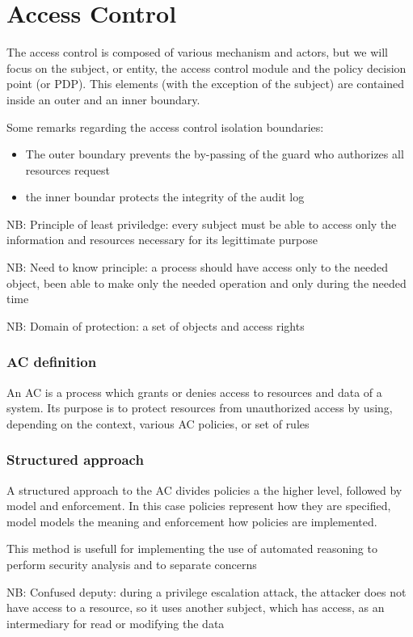 \documentclass[12pt, a4paper]{article}
\begin{document}
\newpage
\section{Access Control}
The access control is composed of various mechanism and actors, but we will focus on the subject, or entity, the 
access control module and the policy decision point (or PDP). This elements (with the exception of the subject)
are contained inside an outer and an inner boundary. 

Some remarks regarding the access control isolation boundaries: 
\begin{itemize}
    \item The outer boundary prevents the by-passing of the guard who authorizes all resources request
    \item the inner boundar protects the integrity of the audit log
\end{itemize}

NB: Principle of least priviledge: every subject must be able to access only the information and resources 
necessary for its legittimate purpose

NB: Need to know principle: a process should have access only to the needed object, been able to make only the needed
operation and only during the needed time

NB: Domain of protection: a set of objects and access rights

\subsubsection*{AC definition}
An AC is a process which grants or denies access to resources and data of a system. Its purpose is to protect 
resources from unauthorized access by using, depending on the context, various AC policies, or set of rules

\subsubsection*{Structured approach}
A structured approach to the AC divides policies a the higher level, followed by model and enforcement. In this case 
policies represent how they are specified, model models the meaning and enforcement how policies are implemented.

This method is usefull for implementing the use of automated reasoning to perform security analysis and to 
separate concerns

NB: Confused deputy: during a privilege escalation attack, the attacker does not have access to a resource, so 
it uses another subject, which has access, as an intermediary for read or modifying the data
\end{document}
